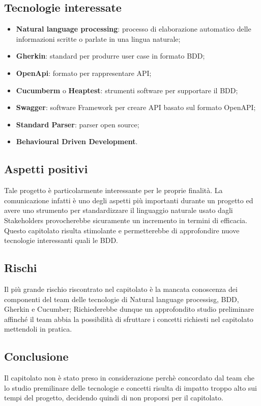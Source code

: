 \documentclass[../studio-di-fattibilita.tex]{subfiles}
\begin{document}
\subsection{Tecnologie interessate}%
\label{tecnologie_interessate}
\begin{itemize}
  \item \textbf{Natural language processing}: processo di elaborazione automatico delle informazioni scritte o parlate in una lingua naturale;
  \item \textbf{Gherkin}: standard per produrre user case in formato BDD;
  \item \textbf{OpenApi}: formato per rappresentare API;
  \item \textbf{Cucumberm} o \textbf{Heaptest}: strumenti software per supportare il BDD;
  \item \textbf{Swagger}: software Framework per creare API basato sul formato OpenAPI;
  \item \textbf{Standard Parser}: parser open source;
  \item \textbf{Behavioural Driven Development}.
\end{itemize}

\subsection{Aspetti positivi}%
\label{aspetti_positivi}
Tale progetto è particolarmente interessante per le proprie finalità. La comunicazione infatti è uno degli aspetti più importanti durante un progetto ed avere uno strumento per standardizzare il linguaggio naturale usato dagli Stakeholders provocherebbe sicuramente un incremento in termini di efficacia. Questo capitolato risulta stimolante e permetterebbe di approfondire nuove tecnologie interessanti quali le BDD.

\subsection{Rischi}%
\label{rischi}
Il più grande rischio riscontrato nel capitolato è la mancata conoscenza dei componenti del team delle tecnologie di Natural language processisg, BDD, Gherkin e Cucumber; Richiederebbe dunque un approfondito studio preliminare affinché il team abbia la possibilità di sfruttare i concetti richiesti nel capitolato mettendoli in pratica.

\subsection{Conclusione}%
\label{sub:conclusione}
Il capitolato non è stato preso in considerazione perchè concordato dal team che lo studio premilinare delle tecnologie e concetti risulta di impatto troppo alto sui tempi del progetto, decidendo quindi di non proporsi per il capitolato.
\end{document}
